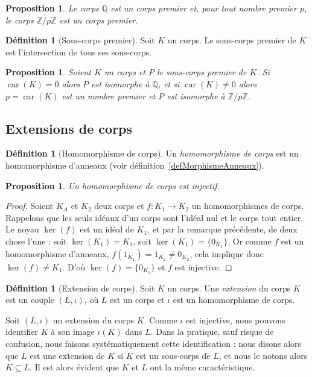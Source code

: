 \documentclass[a4paper, titlepage]{article}
\newtheorem{prop}[theo]{Proposition}
\theoremstyle{definition}
\newtheorem{defi}[theo]{Définition}
\theoremstyle{remark}
\def\Z{\mathbb Z}
\def\Q{\mathbb Q}
\def\car{\operatorname{car}}
\begin{document}
\begin{prop}
Le corps $\Q$ est un corps premier et, pour tout nombre premier $p$, le corps $\Z/p\Z$ est un corps premier.
\end{prop}

\begin{defi}[Sous-corps premier]
Soit $K$ un corps. Le sous-corps premier de $K$ est l'intersection de tous ses sous-corps.
\end{defi}

\begin{prop}
Soient $K$ un corps et $P$ le sous-corps premier de $K$. Si $\car(K) = 0$ alors $P$ est isomorphe à $\Q$, et si $\car(K) \neq 0$ alors $p = \car(K)$ est un nombre premier et $P$ est isomorphe à $\Z/p\Z$.
\end{prop}

\subsection{Extensions de corps}

\begin{defi}[Homomorphisme de corps]
Un \textit{homomorphisme de corps} est un homomorphisme d'anneaux (voir définition~\ref{defMorphismeAnneaux}).
\end{defi}

\begin{prop}
Un homomorphisme de corps est injectif.
\end{prop}

\begin{proof}
Soient $K_A$ et $K_2$ deux corps et $f : K_1 \rightarrow K_2$ un homomorphismes de corps. Rappelons que les seuls idéaux d'un corps sont l'idéal nul et le corps tout entier. Le noyau $\ker(f)$ est un idéal de $K_1$, et par la remarque précédente, de deux chose l'une : soit $\ker(K_1) = K_1$, soit $\ker(K_1)=\{0_{K_1}\}$. Or comme $f$ est un homomorphisme d'anneaux, $f(1_{K_1}) = 1_{K_2} \neq 0_{K_2}$, cela implique donc $\ker(f) \neq K_1$. D'où $\ker(f) = \{0_{K_1}\}$ et $f$ est injective.
\end{proof}

\begin{defi}[Extension de corps]
Soit $K$ un corps. Une \textit{extension} du corps $K$ est un couple $(L, \iota)$, où $L$ est un corps et $\iota$ est un homomorphisme de corps.
\end{defi}

Soit $(L, \iota)$ un extension du corps $K$. Comme $\iota$ est injective, nous pouvons identifier $K$ à son image $\iota(K)$ dans $L$. Dans la pratique, sauf risque de confusion, nous faisons systématiquement cette identification : nous disons alors que $L$ est une extension de $K$ si $K$ est un sous-corps de $L$, et nous le notons alors $K\subseteq L$. Il est alors évident que $K$ et $L$ ont la même caractéristique.
\end{document}
